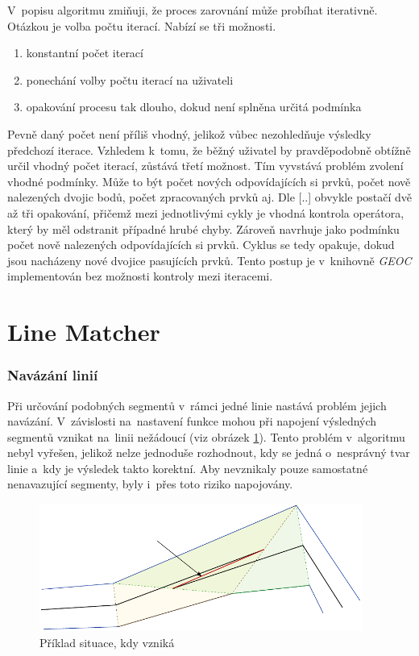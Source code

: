 V~popisu algoritmu zmiňuji, že proces zarovnání může probíhat iterativně.
Otázkou je volba počtu iterací. Nabízí se tři možnosti.
\begin{enumerate}
 \item konstantní počet iterací
 \item ponechání volby počtu iterací na uživateli
 \item opakování procesu tak dlouho, dokud není splněna určitá podmínka
\end{enumerate}
Pevně daný počet není příliš vhodný, jelikož vůbec nezohledňuje výsledky
předchozí iterace. Vzhledem k~tomu, že běžný uživatel by pravděpodobně
obtížně určil vhodný počet iterací, zůstává třetí možnost. Tím vyvstává
problém zvolení vhodné podmínky. Může to být počet nových odpovídajících 
si prvků, počet nově nalezených dvojic bodů, počet zpracovaných prvků aj.
Dle [..]  obvykle postačí dvě až tři opakování, %
přičemž mezi jednotlivými cykly je vhodná kontrola operátora,
který by měl odstranit případné hrubé chyby. Zároveň navrhuje jako podmínku
počet nově nalezených odpovídajících si prvků. Cyklus se tedy opakuje,
dokud jsou nacházeny nové dvojice pasujících prvků. Tento postup je   %
v~knihovně \textit{GEOC} implementován bez možnosti kontroly mezi iteracemi. 


\section{Line Matcher}
\label{problemy-lm}

\subsubsection*{Navázání linií}
Při určování podobných segmentů v~rámci jedné linie nastává problém jejich
navázání. V~závislosti na~nastavení funkce mohou při napojení výsledných
segmentů vznikat na~linii nežádoucí  (viz obrázek \ref{fig:toothpic}). %
Tento problém v~algoritmu nebyl vyřešen, jelikož nelze jednoduše rozhodnout, 
kdy se jedná o~nesprávný tvar linie a~kdy je výsledek takto korektní.
Aby nevznikaly pouze samostatné nenavazující segmenty, byly i~přes toto
riziko napojovány.

\label{toothpic}
  \begin{figure}[hbt]
    \centering
      \includegraphics[width=300pt]{./pictures/tooth.pdf}
      \caption{Příklad situace, kdy vzniká }
      \label{fig:toothpic}
  \end{figure}

